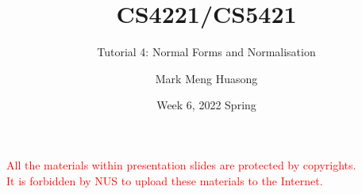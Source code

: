 \title{CS4221/CS5421}

\subtitle{Tutorial 4: Normal Forms and Normalisation}

\author{Mark Meng Huasong}



\date{Week 6, 2022 Spring}

\begin{frame}
	\titlepage
	\begin{tcolorbox}
		\begin{center}
			{\scriptsize \textcolor{red}{All the materials within presentation slides are protected by copyrights.\\
					It is forbidden by NUS to upload these materials to the Internet.}}
		\end{center}
	\end{tcolorbox}
\end{frame}

